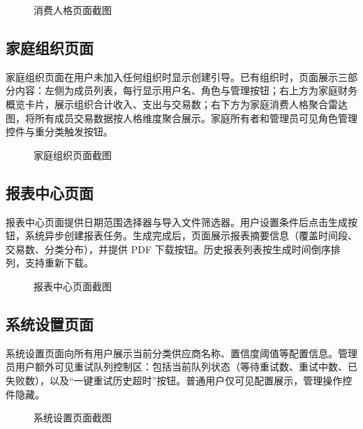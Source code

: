 \begin{figure}[H]
  \centering
  \caption{消费人格页面截图}
  \label{fig:screenshot-personality}
\end{figure}

\subsection{家庭组织页面}

家庭组织页面在用户未加入任何组织时显示创建引导。已有组织时，页面展示三部分内容：左侧为成员列表，每行显示用户名、角色与管理按钮；右上方为家庭财务概览卡片，展示组织合计收入、支出与交易数；右下方为家庭消费人格聚合雷达图，将所有成员交易数据按人格维度聚合展示。家庭所有者和管理员可见角色管理控件与重分类触发按钮。

\begin{figure}[H]
  \centering
  \caption{家庭组织页面截图}
  \label{fig:screenshot-organization}
\end{figure}

\clearpage
\subsection{报表中心页面}

报表中心页面提供日期范围选择器与导入文件筛选器。用户设置条件后点击生成按钮，系统异步创建报表任务。生成完成后，页面展示报表摘要信息（覆盖时间段、交易数、分类分布），并提供 PDF 下载按钮。历史报表列表按生成时间倒序排列，支持重新下载。

\begin{figure}[H]
  \centering
  \caption{报表中心页面截图}
  \label{fig:screenshot-reports}
\end{figure}

\subsection{系统设置页面}

系统设置页面向所有用户展示当前分类供应商名称、置信度阈值等配置信息。管理员用户额外可见重试队列控制区：包括当前队列状态（等待重试数、重试中数、已失败数），以及“一键重试历史超时”按钮。普通用户仅可见配置展示，管理操作控件隐藏。

\begin{figure}[H]
  \centering
  \caption{系统设置页面截图}
  \label{fig:screenshot-settings}
\end{figure}


